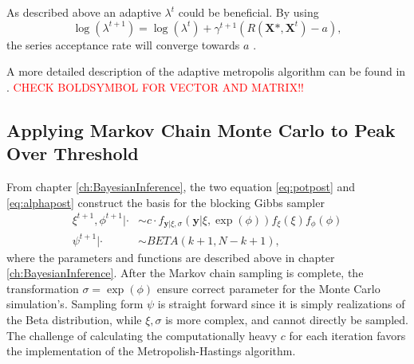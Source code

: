 As described above an adaptive $\lambda^t$ could be beneficial. By using
\begin{equation}
\log(\lambda^{t+1})=\log( \lambda^{t} ) + \gamma^{t+1} \left( R(\boldsymbol{X} \mbox{*},\boldsymbol{X}^{t}) -a \right),
\end{equation}
the series acceptance rate will converge towards $a$ \cite[p.~248]{compstat}.

A more detailed description of the adaptive metropolis algorithm can be found in \cite[p.~247]{compstat}.
\textcolor{red}{CHECK BOLDSYMBOL FOR VECTOR AND MATRIX!!}
\subsection{Applying Markov Chain Monte Carlo to Peak Over Threshold}

From chapter \ref{ch:BayesianInference}, the two equation \eqref{eq:potpost} and \eqref{eq:alphapost} construct the basis for the blocking Gibbs sampler
\begin{align*}
\xi^{t+1},\phi^{t+1}|\cdot & \sim c \cdot f_{\boldsymbol{y}|\xi,\sigma}\left(\boldsymbol{y}|\xi,\exp(\phi)\right)f_{\xi}(\xi)f_{\phi}(\phi)\\
\psi^{t+1}|\cdot & \sim BETA(k+1, N-k+1),
\end{align*}
where the parameters and functions are described above in chapter \ref{ch:BayesianInference}. After the Markov chain sampling is complete, the transformation $\sigma=\exp(\phi)$ ensure correct parameter for the Monte Carlo simulation's. Sampling form $\psi$ is straight forward since it is simply realizations of the Beta distribution, while $\xi, \sigma$ is more complex, and cannot directly be sampled. The challenge of calculating the computationally heavy $c$ for each iteration favors the implementation of the Metropolish-Hastings algorithm.

